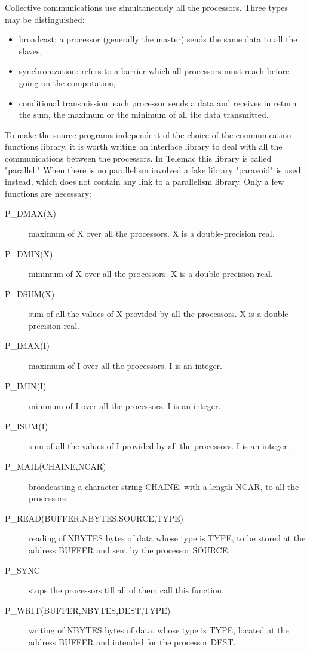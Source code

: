 Collective communications use simultaneously all the processors. Three types
may be distinguished:
\begin{itemize}
  \item broadcast: a processor (generally the master) sends the same data to
    all the slaves,

  \item synchronization: refers to a barrier which all processors must reach
    before going on the computation,

  \item conditional transmission: each processor sends a data and receives in
    return the sum, the maximum or the minimum of all the data transmitted.
\end{itemize}
To make the source programs independent of the choice of the communication
functions library, it is worth writing an interface library to deal with all
the communications between the processors. In Telemac this library is called
"parallel." When there is no parallelism involved a fake library "paravoid" is
used instead, which does not contain any link to a parallelism library. Only a
few functions are necessary:
\begin{description}
  \item [P\_DMAX(X)] maximum of X over all the processors. X is a
    double-precision real.
  \item [P\_DMIN(X)] minimum of X over all the processors. X is a
    double-precision real.
  \item [P\_DSUM(X)] sum of all the values of X provided by all the processors.
    X is a double-precision real.
  \item [P\_IMAX(I)] maximum of I over all the processors. I is an integer.
  \item [P\_IMIN(I)] minimum of I over all the processors. I is an integer.
  \item [P\_ISUM(I)] sum of all the values of I provided by all the processors.
    I is an integer.
  \item [P\_MAIL(CHAINE,NCAR)] broadcasting a character string CHAINE, with a
    length NCAR, to all the processors.
  \item [P\_READ(BUFFER,NBYTES,SOURCE,TYPE)] reading of NBYTES bytes of data
    whose type is TYPE, to be stored at the address BUFFER and sent by the
    processor SOURCE.
  \item [P\_SYNC] stops the processors till all of them call this function.
  \item [P\_WRIT(BUFFER,NBYTES,DEST,TYPE)] writing of NBYTES bytes of data,
    whose type is TYPE, located at the address BUFFER and intended for the
    processor DEST.
\end{description}


